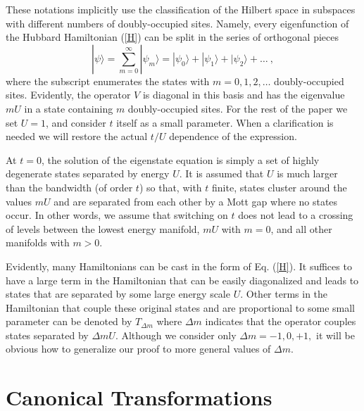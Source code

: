 \documentclass[floatfix,twocolumn,aps,prb,showpacs,superscriptaddress]{revtex4}
\begin{document}
These notations implicitly use the classification of the Hilbert space in
subspaces with different numbers of doubly-occupied sites. Namely, every
eigenfunction of the Hubbard Hamiltonian (\ref{H}) can be split in the
series of orthogonal pieces
\begin{equation}
|\psi \rangle =\sum_{m=0}^{\infty }|\psi _{m}\rangle =|\psi _{0}\rangle
+|\psi _{1}\rangle +|\psi _{2}\rangle +\dots \ ,  \label{expansion_psi_m}
\end{equation}%
where the subscript enumerates the states with $m=0,1,2,\dots $
doubly-occupied sites. Evidently, the operator $V$ is diagonal in this basis
and has the eigenvalue $mU$ in a state containing $m$ doubly-occupied sites.
For the rest of the paper we set $U=1$, and consider $t$ itself as a small
parameter. When a clarification is needed we will restore the actual $t/U$
dependence of the expression.


At $t=0$, the solution of the eigenstate equation is simply a set of highly
degenerate states separated by energy $U$. It is assumed that $U$ is much
larger than the bandwidth (of order $t$) so that, with $t$ finite,
states cluster around the values $mU$ and are separated from each other by a
Mott gap where no states occur. In other words, we assume that switching on $%
t$ does not lead to a crossing of levels between the lowest energy manifold,
$mU$ with $m=0$, and all other manifolds with $m> 0$.


Evidently, many Hamiltonians can be cast in the form of Eq. (\ref{H}). It
suffices to have a large term in the Hamiltonian that can be easily
diagonalized and leads to states that are separated by some large energy
scale $U$. Other terms in the Hamiltonian that couple these original states
and are proportional to some small parameter can be denoted by
$T_{\Delta m}$ where
$\Delta m$ indicates that the operator couples states separated by $\Delta mU$. Although
we consider only $\Delta m=-1,0,+1,$ it will be obvious how to generalize our proof
to more general values of $\Delta m$.




\section{Canonical Transformations}


\label{CT} \setcounter{subsubsection}{0} %
\end{document}
